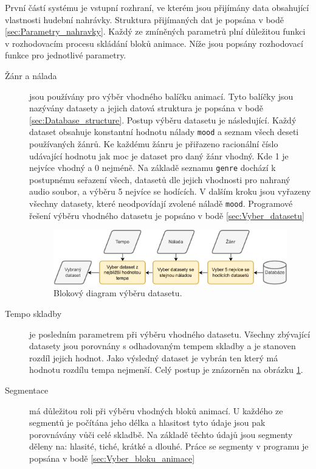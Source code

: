 První částí systému je vstupní rozhraní, ve kterém jsou přijímány data obsahující vlastnosti hudební nahrávky. Struktura přijímaných dat je popsána v bodě \ref{sec:Parametry_nahravky}. Každý ze zmíněných parametrů plní důležitou funkci v rozhodovacím procesu skládání bloků animace. Níže jsou popsány rozhodovací funkce pro jednotlivé parametry.

\begin{description}
    \item[Žánr a nálada] jsou používány pro výběr vhodného balíčku animací. Tyto balíčky jsou nazývány datasety a jejich datová struktura je popsána v bodě \ref{sec:Database_structure}. Postup výběru datasetu je následující. Každý dataset obsahuje konstantní hodnotu nálady \texttt{mood} a seznam všech deseti používaných žánrů. Ke každému žánru je přiřazeno racionální číslo udávající hodnotu jak moc je dataset pro daný žánr vhodný. Kde 1 je nejvíce vhodný a 0 nejméně. Na základě seznamu \texttt{genre} dochází k postupnému seřazení všech, datasetů dle jejich vhodnosti pro nahraný audio soubor, a výběru 5 nejvíce se hodících. V dalším kroku jsou vyřazeny všechny datasety, které neodpovídají zvolené náladě \texttt{mood}. Programové řešení výběru vhodného datasetu je popsáno v bodě \ref{sec:Vyber_datasetu}
    
    \begin{figure}[H]
        \centering
        \includegraphics[width = 1\linewidth]{obrazky/Dataset_selection_diagram.pdf}
        \caption{Blokový diagram výběru datasetu.}
        \label{fig:Dataset_selection_diagram}
    \end{figure}

    \item[Tempo skladby] je posledním parametrem při výběru vhodného datasetu. Všechny zbývající datasety jsou porovnány s odhadovaným tempem skladby a je stanoven rozdíl jejich hodnot. Jako výsledný dataset je vybrán ten který má hodnotu rozdílu tempa nejmenší. Celý postup je znázorněn na obrázku \ref{fig:Dataset_selection_diagram}.
    
    \item[Segmentace] má důležitou roli při výběru vhodných bloků animací. U každého ze segmentů je počítána jeho délka a hlasitost tyto údaje jsou pak porovnávány vůči celé skladbě. Na základě těchto údajů jsou segmenty děleny na: hlasité, tiché, krátké a dlouhé. Práce se segmenty v programu je popsána v bodě \ref{sec:Vyber_bloku_animace}


\end{description}
